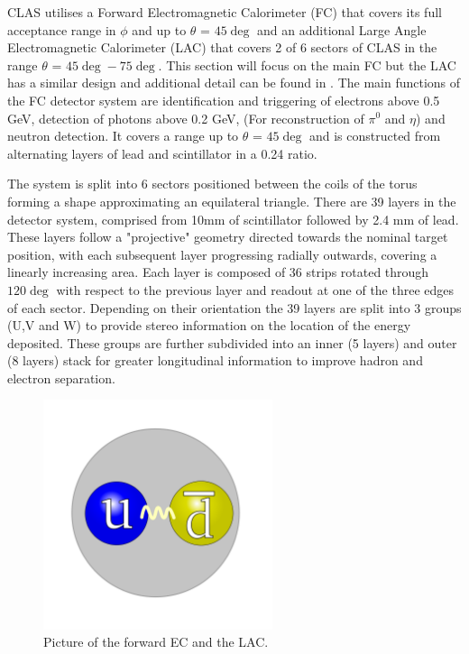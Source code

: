 CLAS utilises a Forward Electromagnetic Calorimeter (FC) that covers its full acceptance range in $\phi$ and up to $\theta$ = $45\deg$ and an additional Large Angle Electromagnetic Calorimeter (LAC) that covers 2 of 6 sectors of CLAS in the range $\theta$ = $45\deg-75\deg$. This section will focus on the main FC but the LAC has a similar design and additional detail can be found in \cite{anghinolfi2000response}. The main functions of the FC detector system are identification and triggering of electrons above 0.5 GeV, detection of photons above 0.2 GeV, (For reconstruction of $\pi^{0}$ and $\eta$) and neutron detection. It covers a range up to $\theta$ = $45\deg$ and is constructed from alternating layers of lead and scintillator in a 0.24 ratio. 

The system is split into 6 sectors positioned between the coils of the torus forming a shape approximating an equilateral triangle. There are 39 layers in the detector system, comprised from 10mm of scintillator followed by 2.4 mm of lead. These layers follow a "projective" geometry directed towards the nominal target position, with each subsequent layer progressing radially outwards, covering a linearly increasing area.  Each layer is composed of 36 strips rotated through $120\deg$ with respect to the previous layer and readout at one of the three edges of each sector. Depending on their orientation the 39 layers are split into 3 groups (U,V and W) to provide stereo information on the location of the energy deposited. These groups are further subdivided into an inner (5 layers) and outer (8 layers) stack for greater longitudinal information to improve hadron and electron separation.

\begin{figure}
	\centering
	\includegraphics[width=0.6\textwidth]{ImgChap1/meson2}
	\caption{Picture of the forward EC and the LAC.}
	\label{CLASForwardEC}
\end{figure}

